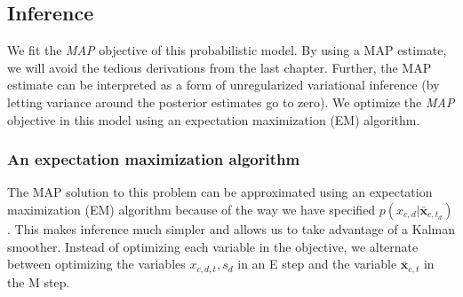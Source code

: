 
\subsection{Inference}
\label{sec:fr_inference}
We fit the \emph{MAP} objective of this probabilistic model.  By using
a MAP estimate, we will avoid the tedious derivations from the last
chapter.  Further, the MAP estimate can be interpreted as a form of
unregularized variational inference (by letting variance around the
posterior estimates go to zero).  We optimize the \emph{MAP} objective
in this model using an expectation maximization (EM) algorithm.

\subsubsection{An expectation maximization algorithm}
The MAP solution to this problem can be approximated using an
expectation maximization (EM) algorithm because of the way we have
specified $p(x_{c,d} | \bm \bar x_{c, t_d})$.  This makes inference
much simpler and allows us to take advantage of a Kalman smoother.
Instead of optimizing each variable in the objective, we alternate
between optimizing the variables $x_{c,d,t}, s_d$ in an E step and the
variable $\bm \bar x_{c,t}$ in the M step.




